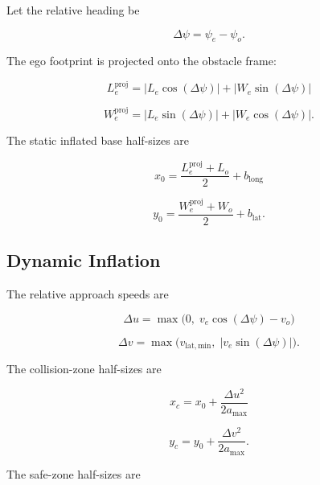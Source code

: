\documentclass[11pt]{article}
\begin{document}
Let the relative heading be

\begin{equation}
\Delta\psi = \psi_e-\psi_o.
\end{equation}

The ego footprint is projected onto the obstacle frame:

\begin{equation}
L_e^{\mathrm{proj}}
=
\left|L_e\cos(\Delta\psi)\right|
+
\left|W_e\sin(\Delta\psi)\right|
\end{equation}

\begin{equation}
W_e^{\mathrm{proj}}
=
\left|L_e\sin(\Delta\psi)\right|
+
\left|W_e\cos(\Delta\psi)\right|.
\end{equation}

The static inflated base half-sizes are

\begin{equation}
x_0
=
\frac{L_e^{\mathrm{proj}} + L_o}{2}
+
b_{\mathrm{long}}
\end{equation}

\begin{equation}
y_0
=
\frac{W_e^{\mathrm{proj}} + W_o}{2}
+
b_{\mathrm{lat}}.
\end{equation}

\subsection{Dynamic Inflation}

The relative approach speeds are

\begin{equation}
\Delta u = \max\!\big(0,\; v_e\cos(\Delta\psi)-v_o\big)
\end{equation}

\begin{equation}
\Delta v = \max\!\big(v_{\mathrm{lat,min}},\; |v_e\sin(\Delta\psi)|\big).
\end{equation}

The collision-zone half-sizes are

\begin{equation}
x_c = x_0 + \frac{\Delta u^2}{2a_{\max}}
\end{equation}

\begin{equation}
y_c = y_0 + \frac{\Delta v^2}{2a_{\max}}.
\end{equation}

The safe-zone half-sizes are
\end{document}
